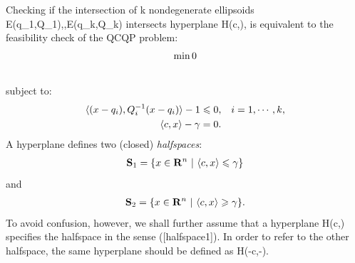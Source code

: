 \documentclass[letterpaper,10pt,english]{sphinxmanual}
\begin{document}
Checking if the intersection of k nondegenerate ellipsoids
E(q_1,Q_1),\cdots,{\mathcal E}(q_k,Q_k) intersects hyperplane
H(c,\gamma), is equivalent to the feasibility check of the QCQP
problem:
\begin{gather}
\begin{split}\min 0\end{split}\notag\\\begin{split}\end{split}\notag
\end{gather}
subject to:
\begin{gather}
\begin{split}\begin{aligned}
\langle (x-q_i),Q_i^{-1}(x-q_i)\rangle - 1 \leqslant0, & & i=1,\cdots,k,\\
\langle c, x\rangle - \gamma = 0. & &\end{aligned}\end{split}\notag
\end{gather}
A hyperplane defines two (closed) \emph{halfspaces}:
\begin{gather}
\begin{split}{\bf S}_1 = \{x\in{\bf R}^n ~|~ \langle c, x\rangle \leqslant\gamma\}
\label{halfspace1}\end{split}\notag
\end{gather}
and
\begin{gather}
\begin{split}{\bf S}_2 = \{x\in{\bf R}^n ~|~ \langle c, x\rangle \geqslant\gamma\}.
\label{halfspace2}\end{split}\notag
\end{gather}
To avoid confusion, however, we shall further assume that a hyperplane
H(c,\gamma) specifies the halfspace in the sense ({[}halfspace1{]}).
In order to refer to the other halfspace, the same hyperplane should be
defined as H(-c,-\gamma).
\end{document}
